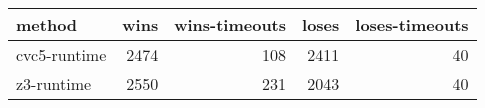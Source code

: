 \begin{tabular}{lrrrr}
\hline
 method       &   wins &   wins-timeouts &   loses &   loses-timeouts \\
\hline
 cvc5-runtime &   2474 &             108 &    2411 &               40 \\
 z3-runtime   &   2550 &             231 &    2043 &               40 \\
\hline
\end{tabular}
